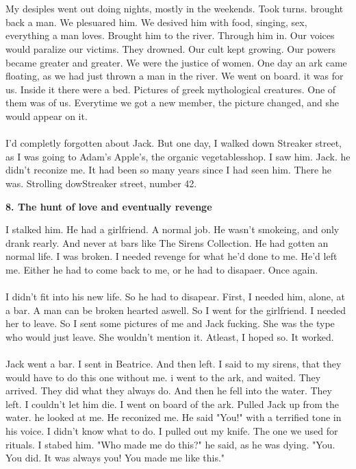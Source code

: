 \documentclass[]{article}
\begin{document}
\\ \\
My desiples went out doing nights, mostly in the weekends. Took turns. brought back a man. We plesuared him. We desived him with food, singing, sex, everything a man loves. Brought him to the river. Through him in. Our voices would paralize our victims. They drowned. Our cult kept growing. Our powers became greater and greater. We were the justice of women. One day an ark came floating, as we had just thrown a man in the river. We went on board. it was for us. Inside it there were a bed. Pictures of greek mythological creatures. One of them was of us. Everytime we got a new member, the picture changed, and she would appear on it.
\\ \\
I'd completly forgotten about Jack. But one day, I walked down Streaker street, as I was going to Adam's Apple's, the organic vegetablesshop. I saw him. Jack. he didn't reconize me. It had been so many years since I had seen him. There he was. Strolling dowStreaker street, number 42.

\begin{center}
	\large\textbf{8. The hunt of love and eventually revenge}
\end{center}

I stalked him. He had a girlfriend. A normal job. He wasn't smokeing, and only drank rearly. And never at bars like The Sirens Collection. He had gotten an normal life. I was broken. I needed revenge for what he'd done to me. He'd left me. Either he had to come back to me, or he had to disapaer. Once again. 
\\ \\
I didn't fit into his new life. So he had to disapear. First, I needed him, alone, at a bar. A man can be broken hearted aswell. So I went for the girlfriend. I needed her to leave. So I sent some pictures of me and Jack fucking. She was the type who would just leave. She wouldn't mention it. Atleast, I hoped so. It worked. 
\\ \\
Jack went a bar. I sent in Beatrice. And then left. I said to my sirens, that they would have to do this one without me. i went to the ark, and waited. They arrived. They did what they always do. And then he fell into the water. They left. I couldn't let him die. I went on board of the ark. Pulled Jack up from the water. he looked at me. He reconized me. He said "You!" with a terrified tone in his voice. I didn't know what to do. I pulled out my knife. The one we used for rituals. I stabed him. "Who made me do this?" he said, as he was dying. "You. You did. It was always you! You made me like this."
\end{document}
